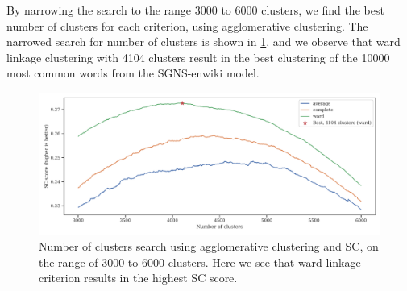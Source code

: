 By narrowing the search to the range 3000 to 6000 clusters, we find the best number of clusters for each criterion, using agglomerative clustering. The narrowed search for number of clusters is shown in \cref{fig:cluster-analysis-agglomerative-internal-cluster-validation-narrow}, and we observe that ward linkage clustering with 4104 clusters result in the best clustering of the 10000 most common words from the SGNS-enwiki model.
\begin{figure}[H]
    \centering
    \includegraphics[width=\textwidth]{thesis/figures/cluster-analysis-agglomerative-internal-cluster-validation-narrow.pdf}
    \caption{Number of clusters search using agglomerative clustering and SC, on the range of 3000 to 6000 clusters. Here we see that ward linkage criterion results in the highest SC score.}
    \label{fig:cluster-analysis-agglomerative-internal-cluster-validation-narrow}
\end{figure}

